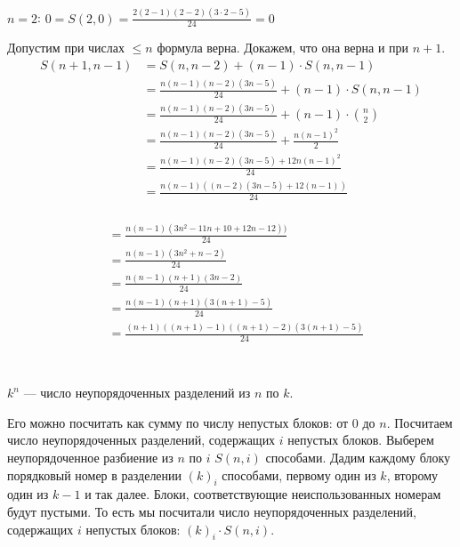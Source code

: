 \documentclass{article}
\begin{document}
\section{}

$n=2$: $0=S(2,0)=\frac{2(2-1)(2-2)(3\cdot 2-5)}{24}=0$

Допустим при числах $\leq n$ формула верна. Докажем, что она верна и при $n+1$.
\begin{align}
    S(n+1, n-1) &= S(n, n-2) + (n-1)\cdot S(n, n-1)\\
    &= \frac{n(n-1)(n-2)(3n-5)}{24} + (n-1)\cdot S(n,n-1)\\
    &= \frac{n(n-1)(n-2)(3n-5)}{24} + (n-1)\cdot {n \choose 2}\\
    &= \frac{n(n-1)(n-2)(3n-5)}{24} + \frac{n(n-1)^2}{2}\\
    &= \frac{n(n-1)(n-2)(3n-5) + 12n(n-1)^2}{24}\\
    &= \frac{n(n-1)((n-2)(3n-5) + 12(n-1))}{24}\\
\end{align}

\begin{align}
    &= \frac{n(n-1)(3n^2-11n+10 + 12n-12))}{24}\\
    &= \frac{n(n-1)(3n^2+n-2)}{24}\\
    &= \frac{n(n-1)(n+1)(3n-2)}{24}\\
    &= \frac{n(n-1)(n+1)(3(n+1)-5)}{24}\\
    &= \frac{(n+1)((n+1)-1)((n+1)-2)(3(n+1)-5)}{24}\\
\end{align}

\section{}

$k^n$ --- число неупорядоченных разделений из $n$ по $k$.

Его можно посчитать как сумму по числу непустых блоков: от $0$ до $n$.
Посчитаем число неупорядоченных разделений, содержащих $i$ непустых блоков.
Выберем неупорядоченное разбиение из $n$ по $i$ $S(n, i)$ способами.  Дадим
каждому блоку порядковый номер в разделении $(k)_i$ способами, первому один из
$k$, второму один из $k-1$ и так далее. Блоки, соответствующие неиспользованных
номерам будут пустыми. То есть мы посчитали число неупорядоченных разделений, содержащих $i$ непустых блоков: $(k)_i\cdot S(n,i)$.

\section{}
\end{document}
